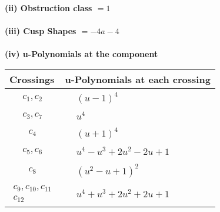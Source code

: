 \documentclass[1p]{elsarticle_modified}
\theoremstyle{definition}
\begin{document}
\flushleft \textbf{(ii) Obstruction class $= 1$}\\~\\
\flushleft \textbf{(iii) Cusp Shapes $= -4 a-4$}\\~\\
\newpage\renewcommand{\arraystretch}{1}
\flushleft \textbf{(iv) u-Polynomials at the component}\newline \\
\begin{tabular}{m{50pt}|m{274pt}}
Crossings & \hspace{64pt}u-Polynomials at each crossing \\
\hline $$\begin{aligned}c_{1},c_{2}\end{aligned}$$&$\begin{aligned}
&(u-1)^4
\end{aligned}$\\
\hline $$\begin{aligned}c_{3},c_{7}\end{aligned}$$&$\begin{aligned}
&u^4
\end{aligned}$\\
\hline $$\begin{aligned}c_{4}\end{aligned}$$&$\begin{aligned}
&(u+1)^4
\end{aligned}$\\
\hline $$\begin{aligned}c_{5},c_{6}\end{aligned}$$&$\begin{aligned}
&u^4- u^3+2 u^2-2 u+1
\end{aligned}$\\
\hline $$\begin{aligned}c_{8}\end{aligned}$$&$\begin{aligned}
&(u^2- u+1)^2
\end{aligned}$\\
\hline $$\begin{aligned}c_{9},c_{10},c_{11}\\c_{12}\end{aligned}$$&$\begin{aligned}
&u^4+u^3+2 u^2+2 u+1
\end{aligned}$\\
\hline
\end{tabular}\\~\\
\end{document}
